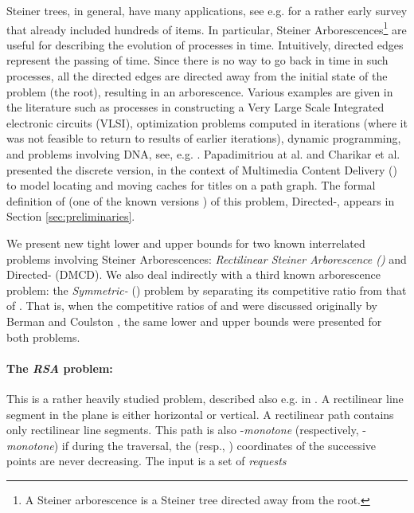 \documentclass[11pt]{article}
\newcommand{\DMCD}{\mbox{\sc DMCD}}
\begin{document}
Steiner trees, in general, have many applications, see e.g.
\cite{steiner-book} for a rather early survey that already included hundreds of items.
In particular, Steiner Arborescences\footnote{A Steiner arborescence is a Steiner tree directed away from the root.
}
are useful for describing the evolution of processes in time.
Intuitively, directed edges represent the passing of time.
Since there is no way to go back in time in such processes, all the directed edges are directed away from the initial state of the problem (the root), resulting in an arborescence. Various examples are given in the literature
such as processes in constructing a
Very Large Scale Integrated electronic circuits (VLSI),
optimization problems computed in iterations (where it was not feasible to return to results of earlier iterations),
dynamic programming, and problems involving DNA, see, e.g. \cite{berman,CDL01,vlsi,KnuthYao09}.
Papadimitriou at al. \cite{papa1,papa3} and Charikar et al. \cite{halperin} presented the discrete version, in the context of Multimedia Content Delivery ()
to model locating and moving caches for titles on a path graph.
The formal definition of (one of the known versions ) of this problem, Directed-,
appears in Section \ref{sec:preliminaries}.







We present new tight lower and upper bounds for two known interrelated problems involving Steiner Arborescences:
{\em Rectilinear Steiner Arborescence ()} and Directed- (\DMCD).
We also deal indirectly with a third known arborescence problem: the {\em Symmetric-} () problem
by separating its competitive ratio from that of . That is, when the competitive ratios of  and  were discussed originally by Berman and Coulston \cite{berman}, the same lower and upper bounds were  presented for both problems.





\paragraph*{The {\em RSA} problem:}
This is a rather heavily studied problem, described also e.g. in \cite{ptas1,shor-rsa,berman,natansky,presented-rsa}.
A rectilinear line segment in the plane is either horizontal or vertical.
A rectilinear path contains only rectilinear line segments.
This path is also -{\em monotone} (respectively, -{\em monotone}) if during the traversal, the  (resp., ) coordinates of the successive points
are never decreasing.
The input is a set of {\em requests}
\end{document}

